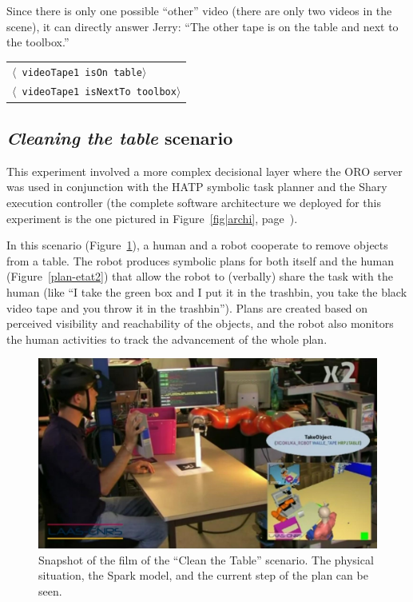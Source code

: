 \documentclass[preprint,3p,times]{elsarticle}
\newcommand{\stmt}[1]{{\footnotesize \tt $\langle$ #1\relax$\rangle$}}
\begin{document}
Since there is only one possible ``other'' video (there are only two videos in
the scene), it can directly answer Jerry: ``The other tape is on the table and
next to the toolbox.''

\begin{center}
\begin{tabular}{l}
\stmt{videoTape1 isOn table}\\
\stmt{videoTape1 isNextTo toolbox}
\end{tabular}
\end{center}


\subsection{\emph{Cleaning the table} scenario}

This experiment involved a more complex decisional layer where the ORO server
was used in conjunction with the HATP symbolic task planner and the {\sc Shary}
execution controller (the complete software architecture we deployed for this
experiment is the one pictured in Figure~\ref{fig|archi},
page~\pageref{fig|archi}).

In this scenario (Figure~\ref{fig|cleantable-video}), a human and a robot
cooperate to remove objects from a table. The robot produces symbolic plans for
both itself and the human (Figure~\ref{plan-etat2})
that allow the robot to (verbally) share the task with the human (like ``I take
the green box and I put it in the trashbin, you take the black video tape and
you throw it in the trashbin''). Plans are created based on perceived
visibility and reachability of the objects, and the robot also monitors the
human activities to track the advancement of the whole plan.

\begin{figure}
    \centering
    \includegraphics[width=0.7\columnwidth]{cleantable.jpg}

    \caption{Snapshot of the film of the ``Clean the Table'' scenario. The
    physical situation, the {\sc Spark} model, and the current step of the plan can
    be seen.}

    \label{fig|cleantable-video}
\end{figure}
\end{document}

